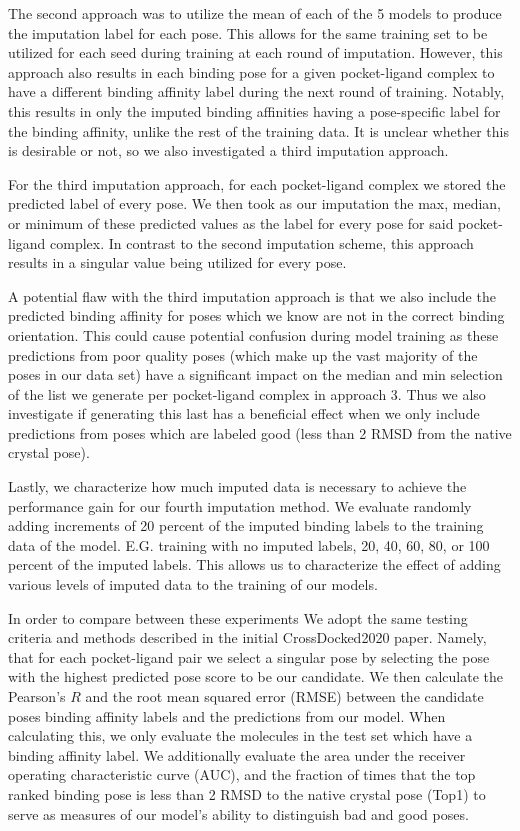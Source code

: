 \documentclass[journal=jmcmar,manuscript=article]{achemso}
\begin{document}
The second approach was to utilize the mean of each of the 5 models to produce the imputation label for each pose.
This allows for the same training set to be utilized for each seed during training at each round of imputation.
However, this approach also results in each binding pose for a given pocket-ligand complex to have a different binding affinity label during the next round of training.
Notably, this results in only the imputed binding affinities having a pose-specific label for the binding affinity, unlike the rest of the training data.
It is unclear whether this is desirable or not, so we also investigated a third imputation approach.

For the third imputation approach, for each pocket-ligand complex we stored the predicted label of every pose.
We then took as our imputation the max, median, or minimum of these predicted values as the label for every pose for said pocket-ligand complex.
In contrast to the second imputation scheme, this approach results in a singular value being utilized for every pose.

A potential flaw with the third imputation approach is that we also include the predicted binding affinity for poses which we know are not in the correct binding orientation.
This could cause potential confusion during model training as these predictions from poor quality poses (which make up the vast majority of the poses in our data set) have a significant impact on the median and min selection of the list we generate per pocket-ligand complex in approach 3.
Thus we also investigate if generating this last has a beneficial effect when we only include predictions from poses which are labeled good (less than 2 RMSD from the native crystal pose).

Lastly, we characterize how much imputed data is necessary to achieve the performance gain for our fourth imputation method.
We evaluate randomly adding increments of 20 percent of the imputed binding labels to the training data of the model.
E.G. training with no imputed labels, 20, 40, 60, 80, or 100 percent of the imputed labels.
This allows us to characterize the effect of adding various levels of imputed data to the training of our models.

In order to compare between these experiments We adopt the same testing criteria and methods described in the initial CrossDocked2020 paper\cite{crossdocked2020}.
Namely, that for each pocket-ligand pair we select a singular pose by selecting the pose with the highest predicted pose score to be our candidate. 
We then calculate the Pearson's $R$ and the root mean squared error (RMSE) between the candidate poses binding affinity labels and the predictions from our model.
When calculating this, we only evaluate the molecules in the test set which have a binding affinity label.
We additionally evaluate the area under the receiver operating characteristic curve (AUC), and the fraction of times that the top ranked binding pose is less than 2 RMSD to the native crystal pose (Top1) to serve as measures of our model's ability to distinguish bad and good poses.
\end{document}

